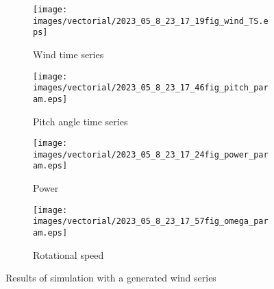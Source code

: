 \begin{figure}[htb]
  \begin{subfigure}{0.5\columnwidth}
    \centering
    \texttt{[image: images/vectorial/2023\_05\_8\_23\_17\_19fig\_wind\_TS.eps]}
    \caption{Wind time series}
    \label{fig:2023_05_8_22_43_35fig_wind_TS.eps}
  \end{subfigure}
  \begin{subfigure}{0.5\columnwidth}
    \centering
    \texttt{[image: images/vectorial/2023\_05\_8\_23\_17\_46fig\_pitch\_param.eps]}
    \caption{Pitch angle time series}
    \label{fig:2023_05_8_22_44_05fig_pitch_param}
  \end{subfigure}
  \begin{subfigure}{0.5\columnwidth}
    \centering
    \texttt{[image: images/vectorial/2023\_05\_8\_23\_17\_24fig\_power\_param.eps]}
    \caption{Power}
    \label{fig:2023_05_8_22_44_15fig_power_param}
  \end{subfigure}
  \begin{subfigure}{0.5\columnwidth}
    \centering
    \texttt{[image: images/vectorial/2023\_05\_8\_23\_17\_57fig\_omega\_param.eps]}
    \caption{Rotational speed}
    \label{fig:2023_05_1_00_50_58fig_pitch_param}
  \end{subfigure}
  \caption{Results of simulation with a generated wind series}
  \label{fig:simulation_rand_wind_NPC}
\end{figure}
